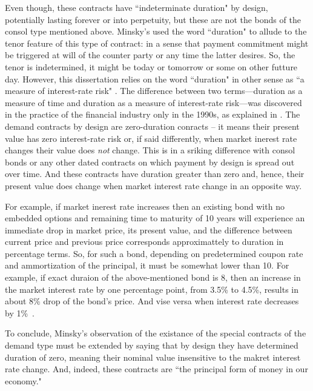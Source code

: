 Even though, these contracts have ``indeterminate duration" by design, potentially lasting forever or into perpetuity, but these are not the bonds of the consol type mentioned above. Minsky's used the word ``duration" to allude to the tenor feature of this type of contract: in a sense that payment commitment might be triggered at will of the counter party or any time the latter desires. So, the tenor is indetermined, it might be today or tomorrow or some on other futture day. However, this dissertation relies on the word ``duration" in other sense as ``a measure of interest-rate risk" \citep{fabozzi2022}. The difference between two terms---duration as a measure of time and duration as a measure of interest-rate risk---was discovered in the practice of the financial industry only in the 1990s, as explained in \citep[p.~9]{fabozzi2022}. The demand contracts by design are zero-duration conracts -- it means their present value has zero interest-rate risk or, if said differently, when market inerest rate changes their value does \textit{not} change. This is in a sriking difference with consol bonds or any other dated contracts on which payment by design is spread out over time. And these contracts have duration greater than zero and, hence, their present value does change when market interest rate change in an opposite way. 

For example, if market inerest rate increases then an existing bond with no embedded options and remaining time to maturity of 10 years will experience an immediate drop in market price, its present value, and the difference between current price and previous price corresponds approximattely to duration in percentage terms. So, for such a bond, depending on predetermined coupon rate and ammortization of the principal, it must be somewhat lower than 10. For example, if exact duraion of the above-mentioned bond is 8, then an increase in the market interest rate by one percentage point, from 3.5\% to 4.5\%, results in about 8\% drop of the bond's price. And vise versa when interest rate decreases by 1\%~\citep[see][p.~198, formula 9-2]{fabozzi2005}.

To conclude, Minsky's observation of the existance of the special contracts of the demand type must be extended by saying that by design they have determined duration of zero, meaning their nominal value insensitive to the makret interest rate change. And, indeed, these contracts are ``the principal form of money in our economy."

